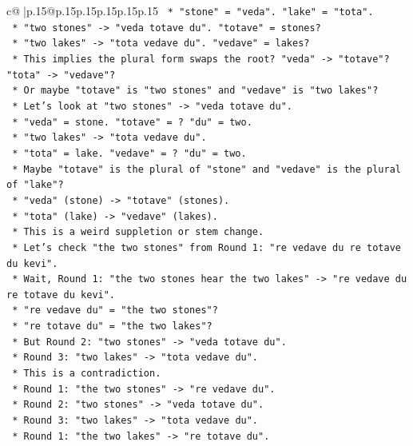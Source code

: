 \documentclass{article}
\begin{document}
{\begin{supertabular}{c@{$\;$}|p{.15\linewidth}@{}p{.15\linewidth}p{.15\linewidth}p{.15\linewidth}p{.15\linewidth}p{.15\linewidth}}
{{{\texttt{    *   "stone" = "veda". "lake" = "tota".} \\
\texttt{    *   "two stones" {-}> "veda totave du". "totave" = stones?} \\
\texttt{    *   "two lakes" {-}> "tota vedave du". "vedave" = lakes?} \\
\texttt{    *   This implies the plural form swaps the root? "veda" {-}> "totave"? "tota" {-}> "vedave"?} \\
\texttt{    *   Or maybe "totave" is "two stones" and "vedave" is "two lakes"?} \\
\texttt{    *   Let's look at "two stones" {-}> "veda totave du".} \\
\texttt{    *   "veda" = stone. "totave" = ? "du" = two.} \\
\texttt{    *   "two lakes" {-}> "tota vedave du".} \\
\texttt{    *   "tota" = lake. "vedave" = ? "du" = two.} \\
\texttt{    *   Maybe "totave" is the plural of "stone" and "vedave" is the plural of "lake"?} \\
\texttt{    *   "veda" (stone) {-}> "totave" (stones).} \\
\texttt{    *   "tota" (lake) {-}> "vedave" (lakes).} \\
\texttt{    *   This is a weird suppletion or stem change.} \\
\texttt{    *   Let's check "the two stones" from Round 1: "re vedave du re totave du kevi".} \\
\texttt{    *   Wait, Round 1: "the two stones hear the two lakes" {-}> "re vedave du re totave du kevi".} \\
\texttt{    *   "re vedave du" = "the two stones"?} \\
\texttt{    *   "re totave du" = "the two lakes"?} \\
\texttt{    *   But Round 2: "two stones" {-}> "veda totave du".} \\
\texttt{    *   Round 3: "two lakes" {-}> "tota vedave du".} \\
\texttt{    *   This is a contradiction.} \\
\texttt{    *   Round 1: "the two stones" {-}> "re vedave du".} \\
\texttt{    *   Round 2: "two stones" {-}> "veda totave du".} \\
\texttt{    *   Round 3: "two lakes" {-}> "tota vedave du".} \\
\texttt{    *   Round 1: "the two lakes" {-}> "re totave du".} \\
}}}
\end{supertabular}}
\end{document}
